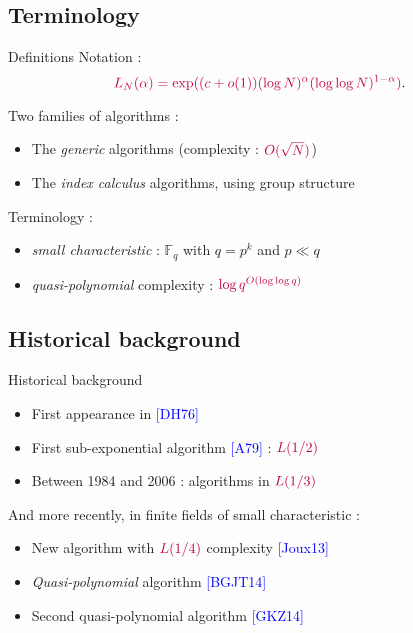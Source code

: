 \documentclass[xcolor=x11names,compress]{beamer}
\theoremstyle{break}
\theoremstyle{sc}
\theoremstyle{definition}
\theoremstyle{remark}
\begin{document}
\subsection{Terminology}
\begin{frame}{Definitions}
  Notation :
  \[
    \textcolor{purple}{L_N(\alpha) = \exp((c+o(1))(\log N)^\alpha(\log\log
      N)^{1-\alpha})}.
  \]

  Two families of algorithms :
  \begin{itemize}
    \item The \emph{generic} algorithms (complexity :
      $\textcolor{purple}{O(\sqrt N)}$)
    \item The \emph{index calculus} algorithms, using group structure
    \end{itemize}
    Terminology :
    \begin{itemize}
    \item \emph{small characteristic} : $\mathbb{F}_q$ with $q=p^k$ and $p\ll q$
    \item \emph{quasi-polynomial} complexity : $\textcolor{purple}{\log
        q^{O(\log \log q)}}$
  \end{itemize}
\end{frame}

\subsection{Historical background}
\begin{frame}{Historical background}
  \begin{itemize}
    \item First appearance in \textcolor{blue}{[DH76]}
    \item First sub-exponential algorithm \textcolor{blue}{[A79]} :
      $\textcolor{purple}{L(1/2)}$
    \item Between 1984 and 2006 : algorithms in $\textcolor{purple}{L(1/3)}$
\end{itemize}
 And more recently, in finite fields of small characteristic :
  \begin{itemize}
    \item New algorithm with $\textcolor{purple}{L(1/4)}$ complexity
      \textcolor{blue}{[Joux13]}
    \item \emph{Quasi-polynomial} algorithm \textcolor{blue}{[BGJT14]}
    \item Second quasi-polynomial algorithm \textcolor{blue}{[GKZ14]}
  \end{itemize}
\end{frame}
\end{document}
